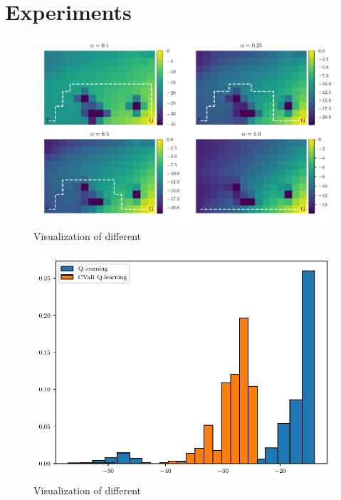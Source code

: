 \section{Experiments}\label{sec:qexperiments}


\begin{figure}[h]
\center
\includegraphics[width=\linewidth]{gfx/q_optimal_paths.pdf}
\caption{Visualization of different}
\label{fig:qgrid}
\end{figure}


\begin{figure}[h]
\center
\includegraphics[width=0.6\linewidth]{gfx/sample_hist.pdf}
\caption{Visualization of different}
\label{fig:qhist}
\end{figure}



